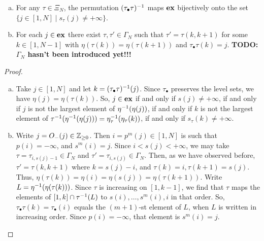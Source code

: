 \begin{lemma}\label{lem:tau_bullet_ex_gamma}
	\leavevmode
	\begin{enumerate}[(a)]
		\item For any $\tau \in \Xi_N$, the permutation $(\tau_\bullet\tau)^{-1}$ maps $\mathbf{ex}$
		      bijectively onto the set $\{j \in [1, N] \mid s_\tau(j) \neq + \infty\}$.
		\item For each $j \in \mathbf{ex}$ there exist $\tau, \tau'\in \Gamma_N$ such that $\tau' = \tau(k,
			      k+1)$ for some $k \in [1, N-1]$ with $\eta(\tau(k)) = \eta(\tau(k+1))$ and
		      $\tau_\bullet\tau(k) = j$. \textbf{TODO: $\Gamma_N$ hasn't been introduced yet!!!}
	\end{enumerate}
\end{lemma}
\begin{proof}
	\begin{enumerate}[(a)]
		\item Take $j\in [1, N]$ and let $k = (\tau_\bullet \tau)^{-1}(j)$. Since $\tau_\bullet$
		      preserves the level sets, we have $\eta(j) = \eta(\tau(k))$. So, $j \in \mathbf{ex}$ if and
		      only if $s(j) \neq + \infty$, if and only if $j$ is not the largest element of
		      $\eta^{-1}(\eta(j))$, if and only if $k$ is not the largest element of
		      $\tau^{-1}(\eta^{-1}(\eta(j))) = \eta_\tau^{-1}(\eta_\tau(k))$, if and only if $s_\tau(k)
			      \neq + \infty$.
		\item Write $j = O_{-}(j) \in \mathbb{Z}_{\geq 0}$. Then $i = p^m(j) \in [1, N]$ is such that $p(i)
			      = -\infty$, and $s^m(i) = j$. Since $i < s(j) < + \infty$, we may take $\tau = \tau_{i,
				      s(j) - 1}\in \Gamma_N$ and $\tau' = \tau_{i, s(j)} \in \Gamma_N$. Then, as we have
		      observed before, $\tau' = \tau(k, k+1)$ where $k = s(j) - i$, and $\tau(k) = i,
			      \tau(k+1) = s(j)$. Thus, $\eta(\tau(k)) = \eta(i) = \eta(s(j)) = \eta(\tau(k+1))$.
		      Write $L = \eta^{-1}(\eta(\tau(k)))$. Since $\tau$ is increasing on $[1, k - 1]$, we
		      find that $\tau$ maps the elements of $[1, k] \cap \tau^{-1}(L)$ to $s(i), \dots,
			      s^m(i), i$ in that order. So, $\tau_\bullet\tau(k) = \tau_\bullet(i)$ equals the
		      $(m+1)$-st element of $L$, when $L$ is written in increasing order. Since $p(i) =
			      -\infty$, that element is $s^m(i) = j$.
	\end{enumerate}
\end{proof}

